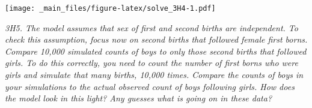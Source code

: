\documentclass[
]{book}
\newenvironment{Shaded}{\begin{snugshade}}{\end{snugshade}}
\newcommand{\AttributeTok}[1]{\textcolor[rgb]{0.77,0.63,0.00}{#1}}
\newcommand{\ConstantTok}[1]{\textcolor[rgb]{0.00,0.00,0.00}{#1}}
\newcommand{\DecValTok}[1]{\textcolor[rgb]{0.00,0.00,0.81}{#1}}
\newcommand{\FunctionTok}[1]{\textcolor[rgb]{0.00,0.00,0.00}{#1}}
\newcommand{\NormalTok}[1]{#1}
\newcommand{\OtherTok}[1]{\textcolor[rgb]{0.56,0.35,0.01}{#1}}
\newcommand{\SpecialCharTok}[1]{\textcolor[rgb]{0.00,0.00,0.00}{#1}}
\newcommand{\StringTok}[1]{\textcolor[rgb]{0.31,0.60,0.02}{#1}}
\begin{document}
\begin{Shaded}
\end{Shaded}

\texttt{[image: \_main\_files/figure-latex/solve\_3H4-1.pdf]}

\emph{3H5. The model assumes that sex of first and second births are independent. To check this assumption, focus now on second births that followed female first borns. Compare 10,000 simulated counts of boys to only those second births that followed girls. To do this correctly, you need to count the number of first borns who were girls and simulate that many births, 10,000 times. Compare the counts of boys in your simulations to the actual observed count of boys following girls. How does the model look in this light? Any guesses what is going on in these data?}
\end{document}
